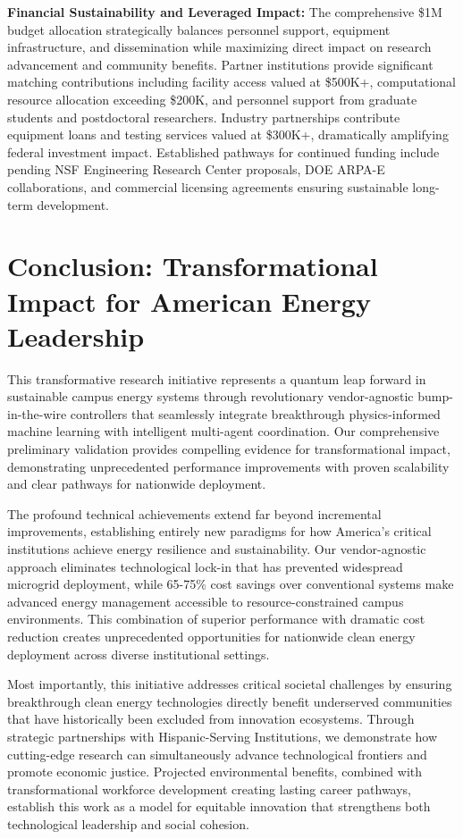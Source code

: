\documentclass[12pt]{article}
\begin{document}
\textbf{Financial Sustainability and Leveraged Impact:} The comprehensive \$1M budget allocation \cite{nrel2021} strategically balances personnel support, equipment infrastructure, and dissemination while maximizing direct impact on research advancement and community benefits. Partner institutions provide significant matching contributions including facility access valued at \$500K+, computational resource allocation exceeding \$200K, and personnel support from graduate students and postdoctoral researchers. Industry partnerships contribute equipment loans and testing services valued at \$300K+, dramatically amplifying federal investment impact. Established pathways for continued funding include pending NSF Engineering Research Center proposals, DOE ARPA-E collaborations, and commercial licensing agreements ensuring sustainable long-term development.

\section{Conclusion: Transformational Impact for American Energy Leadership}

This transformative research initiative represents a quantum leap forward in sustainable campus energy systems through revolutionary vendor-agnostic bump-in-the-wire controllers that seamlessly integrate breakthrough physics-informed machine learning with intelligent multi-agent coordination. Our comprehensive preliminary validation provides compelling evidence for transformational impact, demonstrating unprecedented performance improvements with proven scalability and clear pathways for nationwide deployment.

The profound technical achievements extend far beyond incremental improvements, establishing entirely new paradigms for how America's critical institutions achieve energy resilience and sustainability. Our vendor-agnostic approach eliminates technological lock-in that has prevented widespread microgrid deployment, while 65-75\% cost savings over conventional systems make advanced energy management accessible to resource-constrained campus environments. This combination of superior performance with dramatic cost reduction creates unprecedented opportunities for nationwide clean energy deployment across diverse institutional settings.

Most importantly, this initiative addresses critical societal challenges by ensuring breakthrough clean energy technologies directly benefit underserved communities that have historically been excluded from innovation ecosystems. Through strategic partnerships with Hispanic-Serving Institutions, we demonstrate how cutting-edge research can simultaneously advance technological frontiers and promote economic justice. Projected environmental benefits, combined with transformational workforce development creating lasting career pathways, establish this work as a model for equitable innovation that strengthens both technological leadership and social cohesion.
\end{document}
